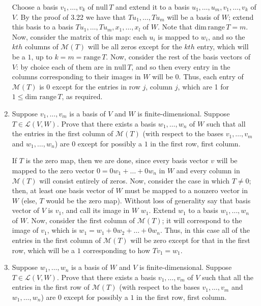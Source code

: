 \documentclass{book}
\begin{document}
\begin{enumerate}
Choose a basis \(v_1,\dots,v_k\) of \(\textrm{null} \, T\) and extend it to a basis \(u_1,\dots,u_m,v_1,\dots,v_k\) of \(V\).  By the proof of 3.22 we have that \(Tu_1,\dots,Tu_m\) will be a basis of \(W\); extend this basis to a basis \(Tu_1,\dots,Tu_m,x_1,\dots,x_l\) of \(W\).  Note that \(\textrm{dim} \, \textrm{range} \, T = m\).  Now, consider the matrix of this map: each \(u_i\) is mapped to \(w_i\), and so the \(kth\) columns of \(\mathcal{M}(T)\) will be all zeros except for the \(kth\) entry, which will be a \(1\), up to \(k=m=\textrm{range} \, T\).  Now, consider the rest of the basis vectors of \(V\): by choice each of them are in \(\textrm{null} \, T\), and so then every entry in the columns corresponding to their images in \(W\) will be \(0\).  Thus, each entry of \(\mathcal{M}(T)\) is \(0\) except for the entries in row \(j\), column \(j\), which are 1 for \(1 \leq \textrm{dim range} \, T\), as required.

\item Suppose \(v_1,\dots,v_m\) is a basis of \(V\) and \(W\) is finite-dimensional.  Suppose \(T \in \mathcal{L}(V,W)\).  Prove that there exists a basis \(w_1,\dots,w_n\) of \(W\) such that all the entries in the first column of \(\mathcal{M}(T)\) (with respect to the bases \(v_1,\dots,v_m\) and \(w_1,\dots,w_n\)) are \(0\) except for possibly a \(1\) in the first row, first column.

If \(T\) is the zero map, then we are done, since every basis vector \(v\) will be mapped to the zero vector \(0=0w_1+\dots+0w_n\) in \(W\) and every column in \(\mathcal{M}(T)\) will consist entirely of zeros.  Now, consider the case in which \(T \neq 0\); then, at least one basis vector of \(W\) must be mapped to a nonzero vector in \(W\) (else, \(T\) would be the zero map).  Without loss of generality say that basis vector of \(V\) is \(v_1\), and call its image in \(W\) \(w_1\).  Extend \(w_1\) to a basis \(w_1,\dots,w_n\) of \(W\).  Now, consider the first column of \(\mathcal{M}(T)\); it will correspond to the image of \(v_1\), which is \(w_1=w_1+0w_2+\dots+0w_n\).  Thus, in this case all of the entries in the first column of \(\mathcal{M}(T)\) will be zero except for that in the first row, which will be a \(1\) corresponding to how \(Tv_1=w_1\).

\item Suppose \(w_1,\dots,w_n\) is a basis of \(W\) and \(V\) is finite-dimensional.  Suppose \(T \in \mathcal{L}(V,W)\).  Prove that there exists a basis \(v_1,\dots,v_m\) of \(V\) such that all the entries in the first row of \(\mathcal{M}(T)\) (with respect to the bases \(v_1,\dots,v_m\) and \(w_1,\dots,w_n\)) are \(0\) except for possibly a \(1\) in the first row, first column.


\end{enumerate}
\end{document}
